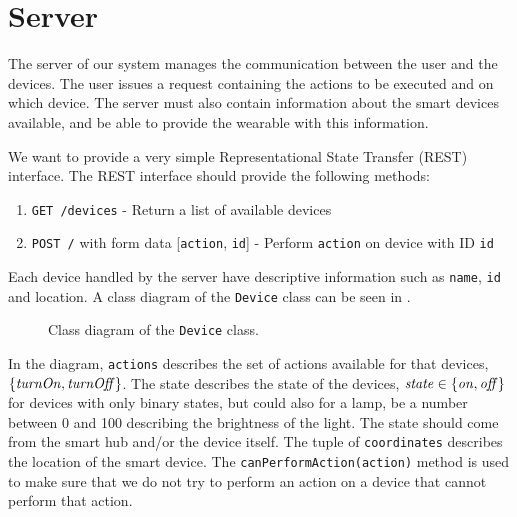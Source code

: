 \section{Server}
The server of our system manages the communication between the user and the devices. 
The user issues a request containing the actions to be executed and on which device. 
The server must also contain information about the smart devices available,
and be able to provide the wearable with this information. 

We want to provide a very simple Representational State Transfer (REST) interface.
The REST interface should provide the following methods:

\begin{enumerate}
  \item \texttt{GET /devices} - Return a list of available devices
  \item \texttt{POST /} with form data [\texttt{action}, \texttt{id}] - Perform \texttt{action} on device with ID \texttt{id}
\end{enumerate}

Each device handled by the server have descriptive information such as \texttt{name}, \texttt{id} and location. 
A class diagram of the \texttt{Device} class can be seen in .

\begin{figure}[!htb]
  \centering
  \label{fig:deviceclass}
  \caption{Class diagram of the \texttt{Device} class.}
\end{figure}

In the diagram, \texttt{actions} describes the set of actions available for that devices, \eg $\{\var{turnOn}, \var{turnOff}\}$. 
The state describes the state of the devices, 
\eg $\var{state} \in \{\var{on}, \var{off}\}$ for devices with only binary states, 
but could also for a lamp, be a number between \num{0} and \num{100} describing the brightness of the light. 
The state should come from the smart hub and/or the device itself. 
The tuple of \texttt{coordinates} describes the location of the smart device. 
The \texttt{canPerformAction(action)} method is used to make sure that we do not try to perform an action on a device that cannot perform that action. 

